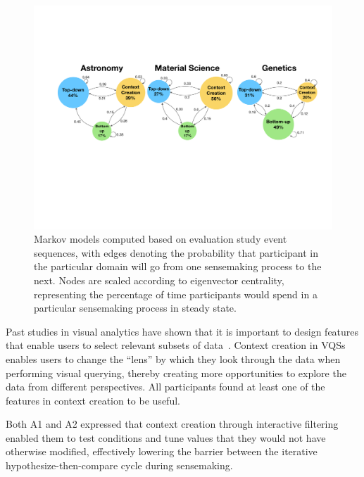  \begin{figure}[ht!]
   \centering
   \includegraphics[width=0.6\linewidth]{figures/markov_transition.pdf}
   \caption{Markov models computed based on evaluation study event sequences, with edges denoting the probability that participant in the particular domain will go from one sensemaking process to the next. Nodes are scaled according to  eigenvector centrality, representing the percentage of time participants would spend in a particular sensemaking process in steady state.}\label{fig:transition}
   \vspace*{-15pt}
 \end{figure}
 \par Past studies in visual analytics
 have shown that it is important to design features
 that enable users to select relevant subsets of data~\cite{Amar2005,Heer2012}.
 Context creation in VQSs enables users to change the ``lens''
 by which they look through the data
 when performing visual querying,
 thereby creating more opportunities
 to explore the data from different perspectives.
 All participants found at least
 one of the features in context creation to be useful.
 \par Both A1 and A2 expressed that context creation through interactive filtering enabled them to test conditions and tune values that they would not have otherwise modified, effectively lowering the barrier between the iterative hypothesize-then-compare cycle during sensemaking.
